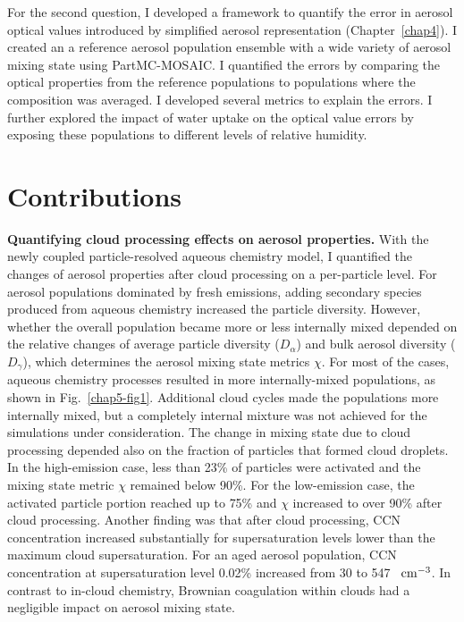\documentclass[edeposit,fullpage]{uiucthesis2009}
\makeatletter
\newcommand{\jcedits}[1]{{\color{blue} #1}}
\DeclareRobustCommand*\unit[1]
 {\ensuremath{%
   {\thinmuskip3mu\relax
    \def\mu{\text{\textmu}}\def~{\,}%
    \ifx\f@series\testbx\mathbf{#1}\else\mathrm{#1}\fi}}}
\makeatother
\begin{document}
For the second question, I developed a framework to quantify the error
in aerosol optical values introduced by simplified aerosol
representation (Chapter~\ref{chap4}). I created an a reference aerosol
population ensemble with a wide variety of aerosol mixing state using
PartMC-MOSAIC. I quantified the errors by comparing the optical
properties from the reference populations to populations where the
composition was averaged. I developed several metrics to explain the
errors. I further explored the impact of water uptake on the optical
value errors by exposing these populations to different levels of
relative humidity.

\section{Contributions}
{\bf Quantifying cloud processing effects on aerosol properties.} With
the newly coupled particle-resolved aqueous chemistry model, I
quantified the changes of aerosol properties after cloud processing on
a per-particle level. For aerosol populations dominated by fresh
emissions, adding secondary species produced from aqueous chemistry
increased the particle diversity. However, whether the overall
population became more or less internally mixed depended on the
relative changes of average particle diversity ($D_{\alpha}$) and bulk
aerosol diversity ($D_{\gamma}$), which determines the aerosol mixing
state metrics $\chi$. For most of the cases, aqueous chemistry
processes resulted in more internally-mixed populations, as shown in
Fig.~\ref{chap5-fig1}. Additional cloud cycles made the populations
more internally mixed, but a completely internal mixture was not
achieved for the simulations under consideration. The change in mixing
state due to cloud processing depended also on the fraction of
particles that formed cloud droplets. In the high-emission case, less
than 23\% of particles were activated and the mixing state metric
$\chi$ remained below 90\%. For the low-emission case, the activated
particle portion reached up to 75\% and $\chi$ increased to over 90\%
after cloud processing. Another finding was that after cloud
processing, CCN concentration increased substantially for
supersaturation levels lower than the maximum cloud
supersaturation. For an aged aerosol population, CCN concentration at
supersaturation level 0.02\% increased from 30 to 547
~\unit{cm^{-3}}. In contrast to in-cloud chemistry, \jcedits{Brownian coagulation} within
clouds had a negligible impact on aerosol mixing state.
\end{document}
